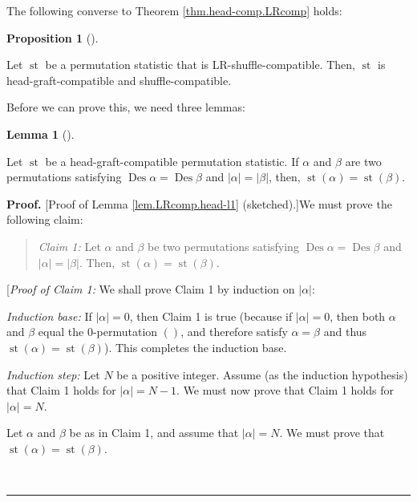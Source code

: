 \documentclass[numbers=enddot,12pt,final,onecolumn,notitlepage]{scrartcl}%
\theoremstyle{definition}
\newtheorem{lem}[theo]{Lemma}
\newenvironment{lemma}[1][]
{\begin{lem}[#1]\begin{leftbar}}
{\end{leftbar}\end{lem}}
\newtheorem{prop}[theo]{Proposition}
\newenvironment{proposition}[1][]
{\begin{prop}[#1]\begin{leftbar}}
{\end{leftbar}\end{prop}}
\newenvironment{statement}{\begin{quote}}{\end{quote}}
\newenvironment{proof}[1][Proof]{\noindent\textbf{#1.} }{\ \rule{0.5em}{0.5em}}
\newenvironment{verlong}{}{}
\begin{document}
\begin{verlong}
The following converse to Theorem \ref{thm.head-comp.LRcomp} holds:

\begin{proposition}
\label{prop.LRcomp.head}Let $\operatorname*{st}$ be a permutation statistic
that is LR-shuffle-compatible. Then, $\operatorname*{st}$ is
head-graft-compatible and shuffle-compatible.
\end{proposition}

Before we can prove this, we need three lemmas:

\begin{lemma}
\label{lem.LRcomp.head-l1}Let $\operatorname*{st}$ be a head-graft-compatible
permutation statistic. If $\alpha$ and $\beta$ are two permutations satisfying
$\operatorname*{Des}\alpha=\operatorname*{Des}\beta$ and $\left\vert
\alpha\right\vert =\left\vert \beta\right\vert $, then, $\operatorname*{st}%
\left(  \alpha\right)  =\operatorname*{st}\left(  \beta\right)  $.
\end{lemma}

\begin{proof}
[Proof of Lemma \ref{lem.LRcomp.head-l1} (sketched).]We must prove the
following claim:

\begin{statement}
\textit{Claim 1:} Let $\alpha$ and $\beta$ be two permutations satisfying
$\operatorname*{Des}\alpha=\operatorname*{Des}\beta$ and $\left\vert
\alpha\right\vert =\left\vert \beta\right\vert $. Then, $\operatorname*{st}%
\left(  \alpha\right)  =\operatorname*{st}\left(  \beta\right)  $.
\end{statement}

[\textit{Proof of Claim 1:} We shall prove Claim 1 by induction on $\left\vert
\alpha\right\vert $:

\textit{Induction base:} If $\left\vert \alpha\right\vert =0$, then Claim 1 is
true (because if $\left\vert \alpha\right\vert =0$, then both $\alpha$ and
$\beta$ equal the $0$-permutation $\left(  {}\right)  $, and therefore
satisfy $\alpha=\beta$ and thus $\operatorname*{st}\left(  \alpha\right)
=\operatorname*{st}\left(  \beta\right)  $). This completes the induction base.

\textit{Induction step:} Let $N$ be a positive integer. Assume (as the
induction hypothesis) that Claim 1 holds for $\left\vert \alpha\right\vert
=N-1$. We must now prove that Claim 1 holds for $\left\vert \alpha\right\vert
=N$.

Let $\alpha$ and $\beta$ be as in Claim 1, and assume that $\left\vert
\alpha\right\vert =N$. We must prove that $\operatorname*{st}\left(
\alpha\right)  =\operatorname*{st}\left(  \beta\right)  $.


\end{proof}
\end{verlong}
\end{document}
